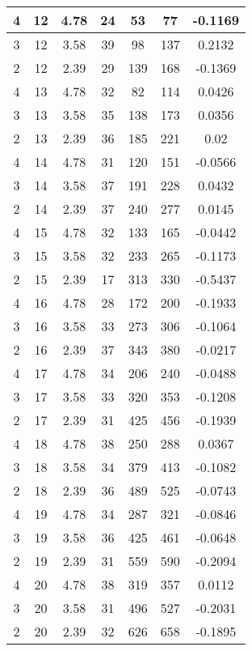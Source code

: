 \documentclass[letterpaper, 12pt]{article}
\begin{document}
\begin{longtable}{|c|c|c|c|c|c|c|}
\hline
4 & 12 & 4.78 & 24 & 53 & 77 & -0.1169 \\
\hline
3 & 12 & 3.58 & 39 & 98 & 137 & 0.2132 \\
\hline
2 & 12 & 2.39 & 29 & 139 & 168 & -0.1369 \\
\hline
4 & 13 & 4.78 & 32 & 82 & 114 & 0.0426 \\
\hline
3 & 13 & 3.58 & 35 & 138 & 173 & 0.0356 \\
\hline
2 & 13 & 2.39 & 36 & 185 & 221 & 0.02 \\
\hline
4 & 14 & 4.78 & 31 & 120 & 151 & -0.0566 \\
\hline
3 & 14 & 3.58 & 37 & 191 & 228 & 0.0432 \\
\hline
2 & 14 & 2.39 & 37 & 240 & 277 & 0.0145 \\
\hline
4 & 15 & 4.78 & 32 & 133 & 165 & -0.0442 \\
\hline
3 & 15 & 3.58 & 32 & 233 & 265 & -0.1173 \\
\hline
2 & 15 & 2.39 & 17 & 313 & 330 & -0.5437 \\
\hline
4 & 16 & 4.78 & 28 & 172 & 200 & -0.1933 \\
\hline
3 & 16 & 3.58 & 33 & 273 & 306 & -0.1064 \\
\hline
2 & 16 & 2.39 & 37 & 343 & 380 & -0.0217 \\
\hline
4 & 17 & 4.78 & 34 & 206 & 240 & -0.0488 \\
\hline
3 & 17 & 3.58 & 33 & 320 & 353 & -0.1208 \\
\hline
2 & 17 & 2.39 & 31 & 425 & 456 & -0.1939 \\
\hline
4 & 18 & 4.78 & 38 & 250 & 288 & 0.0367 \\
\hline
3 & 18 & 3.58 & 34 & 379 & 413 & -0.1082 \\
\hline
2 & 18 & 2.39 & 36 & 489 & 525 & -0.0743 \\
\hline
4 & 19 & 4.78 & 34 & 287 & 321 & -0.0846 \\
\hline
3 & 19 & 3.58 & 36 & 425 & 461 & -0.0648 \\
\hline
2 & 19 & 2.39 & 31 & 559 & 590 & -0.2094 \\
\hline
4 & 20 & 4.78 & 38 & 319 & 357 & 0.0112 \\
\hline
3 & 20 & 3.58 & 31 & 496 & 527 & -0.2031 \\
\hline
2 & 20 & 2.39 & 32 & 626 & 658 & -0.1895 \\
\hline
\end{longtable}
\end{document}
